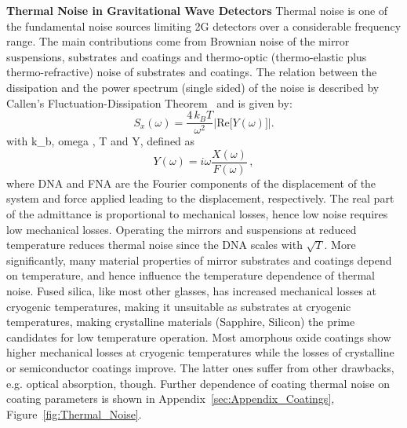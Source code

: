 \begin{Infobox}{\bf Thermal Noise in Gravitational Wave Detectors}
Thermal noise is one of the fundamental noise sources limiting \ac{2G} detectors over a considerable frequency range. The main contributions come from Brownian noise of the mirror suspensions, substrates and coatings and thermo-optic (thermo-elastic plus thermo-refractive) noise of substrates and coatings. The relation between the dissipation and the power spectrum (single sided) of the noise is described by Callen's Fluctuation-Dissipation Theorem~\cite{CaWe1951, Kubo:FDT, Callen:1959} and is given by:
\begin{equation}
S_x(\omega) = \frac{4\,k_B T}{\omega^2} \left| \mathrm{Re} \big[ Y(\omega) \big]\right| .
\end{equation}
\label{eq:FDT}
with \acf{k_b}, \acf{omega} , \acf{T} and \acf{Y}, defined as
\begin{equation}
Y(\omega) = i \omega\frac{X(\omega)}{F(\omega)} \, ,
\end{equation}
where \acs{DNA} and \acs{FNA} are the Fourier components of the displacement of the system and force applied leading to the displacement, respectively. The real part of the admittance is proportional to mechanical losses, hence low noise requires low mechanical losses.
Operating the mirrors and suspensions at reduced temperature reduces thermal noise since the 
\ac{DNA} scales with $\sqrt{T}$. 
More significantly, many material properties of mirror substrates and coatings depend on temperature, and hence influence the temperature dependence of thermal noise.
Fused silica, like most other glasses, has increased mechanical losses at cryogenic temperatures, making it unsuitable as substrates at cryogenic temperatures, making crystalline materials (Sapphire, Silicon) the prime candidates for low temperature operation.
Most amorphous oxide coatings show higher mechanical losses at cryogenic temperatures while the losses of crystalline or semiconductor coatings improve. The latter ones suffer from other drawbacks, e.g. optical absorption, though.
Further dependence of coating thermal noise on coating parameters is shown in Appendix~\ref{sec:Appendix_Coatings}, Figure~\ref{fig:Thermal_Noise}.
\label{Box:Thermal}
\end{Infobox}

